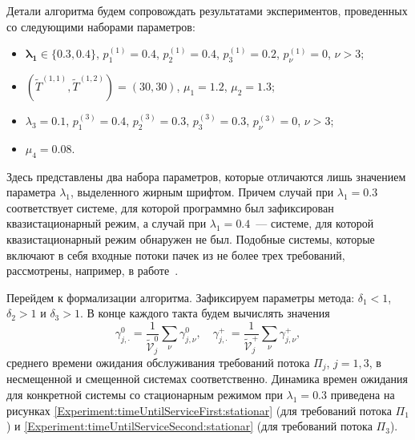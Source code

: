 Детали алгоритма будем сопровождать результатами экспериментов, проведенных со следующими наборами параметров:
\begin{itemize}
    \item $\boldsymbol{\lambda_1\in \{0.3, 0.4\}}$, $p_{1}^{(1)}=0.4$, $p_{2}^{(1)}=0.4$, $p_{3}^{(1)}=0.2$, $p_{\nu}^{(1)}=0$, $\nu > 3$;
    \item $(\widetilde{T}^{(1,1)}, \widetilde{T}^{(1,2)})=(30,30)$, $\mu_1 = 1.2$, $\mu_2 = 1.3$;
    \item $\lambda_3=0.1$, $p_{1}^{(3)}=0.4$, $p_{2}^{(3)}=0.3$, $p_{3}^{(3)}=0.3$, $p_{\nu}^{(3)}=0$, $\nu > 3$;
        \item $\mu_4= 0.08$.
\end{itemize}
Здесь представлены два набора параметров, которые отличаются лишь значением параметра $\lambda_1$, выделенного жирным шрифтом. Причем случай при $\lambda_1=0.3$ соответствует системе, для которой программно был зафиксирован квазистационарный режим, а случай при $\lambda_1=0.4$~--- системе, для которой квазистационарный режим обнаружен не был. Подобные системы, которые включают в себя входные потоки пачек из не более трех требований, рассмотрены, например, в работе~\cite{FedotkinRachinskaya}.


Перейдем к формализации алгоритма. Зафиксируем параметры метода:  $\delta_1 < 1$, $\delta_2 > 1$ и $\delta_3 > 1$. В конце каждого такта будем вычислять значения 
\begin{equation}
   \gamma_{j,\cdot}^0 = \frac{1}{\tilde{\mathcal{V}}_j^0}\sum_{\nu} \gamma_{j,\nu}^0, \quad \gamma_{j,\cdot}^+ = \frac{1}{\tilde{\mathcal{V}}_j^+}\sum_{\nu} \gamma_{j,\nu}^+,
\end{equation}
среднего времени ожидания обслуживания требований потока $\Pi_j$, $j=1,3$, в несмещенной и смещенной системах соответственно. Динамика времен ожидания для конкретной системы со стационарным режимом при $\lambda_1=0.3$ приведена на рисунках \ref{Experiment:timeUntilServiceFirst:stationar} (для требований потока $\Pi_1$) и \ref{Experiment:timeUntilServiceSecond:stationar} (для требований потока $\Pi_3$).



